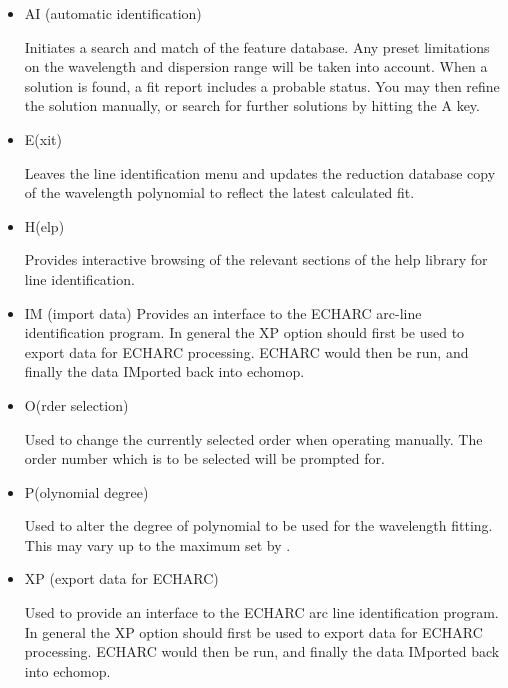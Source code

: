 \begin{itemize}

\item {\sunspec{\Large\tt}{\bf} AI} (automatic identification)

      Initiates a search and
      match of the feature database. Any preset limitations on the
      wavelength and dispersion range will be taken into account. When a
      solution is found, a fit report includes a probable status.
      You may then refine the solution manually, or search for
      further solutions by hitting the A key.


\item {\sunspec{\Large\tt}{\bf} E}(xit)

      Leaves the line identification menu and
      updates the reduction database copy of the wavelength polynomial to
      reflect the latest calculated fit.

\item {\sunspec{\Large\tt}{\bf} H}(elp)

      Provides interactive browsing of the relevant
      sections of the help library for line identification.

\item {\sunspec{\Large\tt}{\bf} IM} (import  data)
      Provides an interface
      to the ECHARC arc-line identification program. In general the XP
      option should first be used to export data for ECHARC processing.
      ECHARC would then be run, and finally the data IMported back into
      {\sc echomop}.

\item {\sunspec{\Large\tt}{\bf} O}(rder selection)

      Used to change the currently
      selected order when operating manually. The order number which is to
      be selected will be prompted for.

\item {\sunspec{\Large\tt}{\bf} P}(olynomial degree)

      Used to alter the degree of
      polynomial to be used for the wavelength fitting. This may vary up to
      the maximum set by \@.

\item {\sunspec{\Large\tt}{\bf} XP} (export data for ECHARC)

      Used to provide an
      interface to the ECHARC arc line identification program. In general
      the XP option should first be used to export data for ECHARC
      processing. ECHARC would then be run, and finally the data IMported
      back into {\sc echomop}.


\end{itemize}
